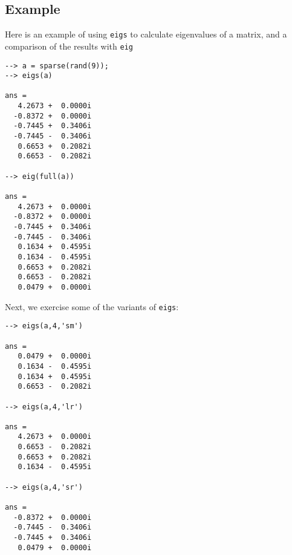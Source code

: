\subsection{Example}

Here is an example of using \verb|eigs| to calculate eigenvalues
of a matrix, and a comparison of the results with \verb|eig|
\begin{verbatim}
--> a = sparse(rand(9));
--> eigs(a)

ans = 
   4.2673 +  0.0000i 
  -0.8372 +  0.0000i 
  -0.7445 +  0.3406i 
  -0.7445 -  0.3406i 
   0.6653 +  0.2082i 
   0.6653 -  0.2082i 

--> eig(full(a))

ans = 
   4.2673 +  0.0000i 
  -0.8372 +  0.0000i 
  -0.7445 +  0.3406i 
  -0.7445 -  0.3406i 
   0.1634 +  0.4595i 
   0.1634 -  0.4595i 
   0.6653 +  0.2082i 
   0.6653 -  0.2082i 
   0.0479 +  0.0000i 
\end{verbatim}
Next, we exercise some of the variants of \verb|eigs|:
\begin{verbatim}
--> eigs(a,4,'sm')

ans = 
   0.0479 +  0.0000i 
   0.1634 -  0.4595i 
   0.1634 +  0.4595i 
   0.6653 -  0.2082i 

--> eigs(a,4,'lr')

ans = 
   4.2673 +  0.0000i 
   0.6653 -  0.2082i 
   0.6653 +  0.2082i 
   0.1634 -  0.4595i 

--> eigs(a,4,'sr')

ans = 
  -0.8372 +  0.0000i 
  -0.7445 -  0.3406i 
  -0.7445 +  0.3406i 
   0.0479 +  0.0000i 
\end{verbatim}
